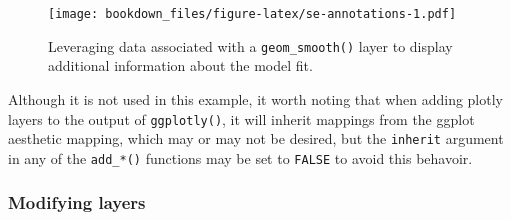 \documentclass[12pt,]{isuthesis}
\newenvironment{Shaded}{\begin{snugshade}}{\end{snugshade}}
\newcommand{\KeywordTok}[1]{\textcolor[rgb]{0.13,0.29,0.53}{\textbf{{#1}}}}
\newcommand{\DataTypeTok}[1]{\textcolor[rgb]{0.13,0.29,0.53}{{#1}}}
\newcommand{\DecValTok}[1]{\textcolor[rgb]{0.00,0.00,0.81}{{#1}}}
\newcommand{\StringTok}[1]{\textcolor[rgb]{0.31,0.60,0.02}{{#1}}}
\newcommand{\NormalTok}[1]{{#1}}
\begin{document}
\begin{Shaded}
\end{Shaded}

\begin{figure}[htbp]
\centering
\texttt{[image: bookdown\_files/figure-latex/se-annotations-1.pdf]}
\caption{\label{fig:se-annotations}Leveraging data associated with a
\texttt{geom\_smooth()} layer to display additional information about
the model fit.}
\end{figure}

Although it is not used in this example, it worth noting that when
adding plotly layers to the output of \texttt{ggplotly()}, it will
inherit mappings from the ggplot aesthetic mapping, which may or may not
be desired, but the \texttt{inherit} argument in any of the
\texttt{add\_*()} functions may be set to \texttt{FALSE} to avoid this
behavoir.

\hypertarget{modifying-layers}{\subsubsection{Modifying
layers}\label{modifying-layers}}
\end{document}
